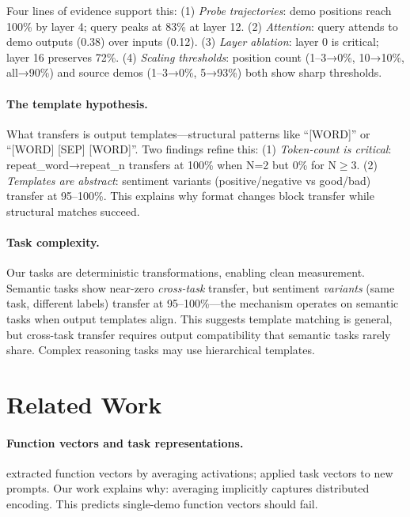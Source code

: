 \documentclass{article}
\begin{document}
Four lines of evidence support this: (1) \emph{Probe trajectories}: demo positions reach 100\% by layer 4; query peaks at 83\% at layer 12. (2) \emph{Attention}: query attends to demo outputs (0.38) over inputs (0.12). (3) \emph{Layer ablation}: layer 0 is critical; layer 16 preserves 72\%. (4) \emph{Scaling thresholds}: position count (1--3→0\%, 10→10\%, all→90\%) and source demos (1--3→0\%, 5→93\%) both show sharp thresholds.

\paragraph{The template hypothesis.}
What transfers is output templates---structural patterns like ``[WORD]'' or ``[WORD] [SEP] [WORD]''. Two findings refine this: (1) \emph{Token-count is critical}: repeat\_word→repeat\_n transfers at 100\% when N=2 but 0\% for N$\geq$3. (2) \emph{Templates are abstract}: sentiment variants (positive/negative vs good/bad) transfer at 95--100\%. This explains why format changes block transfer while structural matches succeed.

\paragraph{Task complexity.}
Our tasks are deterministic transformations, enabling clean measurement. Semantic tasks show near-zero \emph{cross-task} transfer, but sentiment \emph{variants} (same task, different labels) transfer at 95--100\%---the mechanism operates on semantic tasks when output templates align. This suggests template matching is general, but cross-task transfer requires output compatibility that semantic tasks rarely share. Complex reasoning tasks \citep{wei2022chain} may use hierarchical templates.

\section{Related Work}
\label{sec:related}

\paragraph{Function vectors and task representations.}
\citet{todd2023function} extracted function vectors by averaging activations; \citet{hendel2023context} applied task vectors to new prompts. Our work explains why: averaging implicitly captures distributed encoding. This predicts single-demo function vectors should fail.
\end{document}
